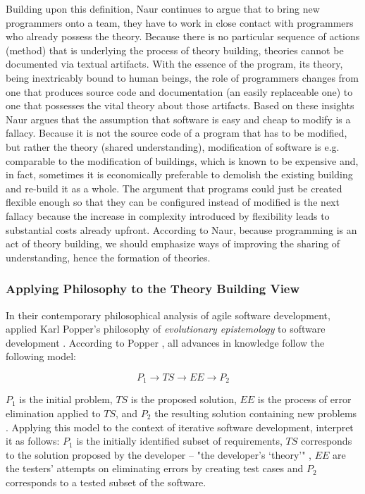 Building upon this definition, Naur continues to argue that to bring new programmers onto a team, they have to work in close contact with programmers who already possess the theory.
Because there is no particular sequence of actions (method) that is underlying the process of theory building, theories cannot be documented via textual artifacts.
With the essence of the program, its theory, being inextricably bound to human beings, the role of programmers changes from one that produces source code and documentation (an easily replaceable one) to one that possesses the vital theory about those artifacts.
Based on these insights Naur argues that the assumption that software is easy and cheap to modify is a fallacy.
Because it is not the source code of a program that has to be modified, but rather the theory (shared understanding), modification of software is e.g. comparable to the modification of buildings, which is known to be expensive and, in fact, sometimes it is economically preferable to demolish the existing building and re-build it as a whole.
The argument that programs could just be created flexible enough so that they can be configured instead of modified is the next fallacy because the increase in complexity introduced by flexibility leads to substantial costs already upfront.
According to Naur, because programming is an act of theory building, we should emphasize ways of improving the sharing of understanding, hence the formation of theories.

\subsubsection{Applying Philosophy to the Theory Building View}

In their contemporary philosophical analysis of agile software development, \citeauthor{northover_agile_2007} applied Karl Popper's philosophy of \emph{evolutionary epistemology} to software development \cite{northover_agile_2007}.
According to Popper \cite{northover_karl_2006}, all advances in knowledge follow the following model:

\[P_1 \rightarrow TS \rightarrow EE \rightarrow P_2\]

$P_1$ is the initial problem, $TS$ is the proposed solution, $EE$ is the process of error elimination applied to $TS$, and $P_2$ the resulting solution containing new problems \cite{northover_karl_2006}.
Applying this model to the context of iterative software development, \citeauthor{northover_agile_2007} interpret it as follows: $P_1$ is the initially identified subset of requirements, $TS$ corresponds to the solution proposed by the developer -- "the developer's `theory'" \cite{northover_agile_2007}, $EE$ are the testers' attempts on eliminating errors by creating test cases and $P_2$ corresponds to a tested subset of the software.

